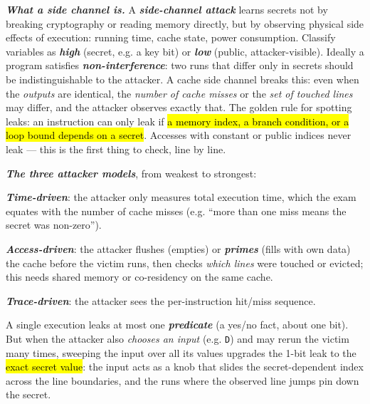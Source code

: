 \documentclass[12pt, a4paper]{article}
\newcommand{\term}[1]{\textbf{\textit{#1}}}        %
\newcommand{\imp}[1]{\hl{#1}}                       %
\begin{document}
\term{What a side channel is.} A \term{side-channel attack} learns secrets not by breaking cryptography or reading memory directly, but by observing physical side effects of execution: running time, cache state, power consumption. Classify variables as \term{high} (secret, e.g. a key bit) or \term{low} (public, attacker-visible). Ideally a program satisfies \term{non-interference}: two runs that differ only in secrets should be indistinguishable to the attacker. A cache side channel breaks this: even when the \emph{outputs} are identical, the \emph{number of cache misses} or the \emph{set of touched lines} may differ, and the attacker observes exactly that. The golden rule for spotting leaks: an instruction can only leak if \imp{a memory index, a branch condition, or a loop bound depends on a secret}. Accesses with constant or public indices never leak --- this is the first thing to check, line by line.

\term{The three attacker models}, from weakest to strongest: \begin{tightitem} \item \term{Time-driven}: the attacker only measures total execution time, which the exam equates with the number of cache misses (e.g. ``more than one miss means the secret was non-zero''). \item \term{Access-driven}: the attacker flushes (empties) or \term{primes} (fills with own data) the cache before the victim runs, then checks \emph{which lines} were touched or evicted; this needs shared memory or co-residency on the same cache. \item \term{Trace-driven}: the attacker sees the per-instruction hit/miss sequence. \end{tightitem} A single execution leaks at most one \term{predicate} (a yes/no fact, about one bit). But when the attacker also \emph{chooses an input} (e.g. \texttt{D}) and may rerun the victim many times, sweeping the input over all its values upgrades the 1-bit leak to the \imp{exact secret value}: the input acts as a knob that slides the secret-dependent index across the line boundaries, and the runs where the observed line jumps pin down the secret.
\end{document}

